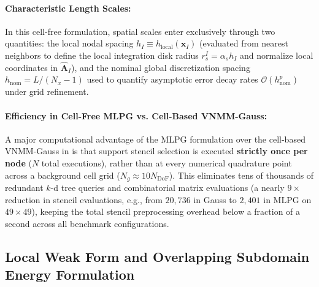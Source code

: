 \documentclass[VANCOUVER,Times1COL]{WileyNJD-v5}
\begin{document}
\paragraph{Characteristic Length Scales:}
In this cell-free formulation, spatial scales enter exclusively through two quantities:
the local nodal spacing $h_I \equiv h_{\mathrm{local}}(\mathbf{x}_I)$ (evaluated from nearest neighbors to define the local integration disk radius $r_s^I = \alpha_s h_I$ and normalize local coordinates in $\widehat{\mathbf{A}}_I$), and the nominal global discretization spacing $h_{\mathrm{nom}} = L/(N_x - 1)$ used to quantify asymptotic error decay rates $\mathcal{O}(h_{\mathrm{nom}}^p)$ under grid refinement.

\paragraph{Efficiency in Cell-Free MLPG vs. Cell-Based VNMM-Gauss:}
A major computational advantage of the MLPG formulation over the cell-based VNMM-Gauss in \cite{stable_vnmm2d_2026} is that support stencil selection is executed \textbf{strictly once per node} ($N$ total executions), rather than at every numerical quadrature point across a background cell grid ($N_g \approx 10 N_{\mathrm{DoF}}$). This eliminates tens of thousands of redundant $k$-d tree queries and combinatorial matrix evaluations (a nearly $9\times$ reduction in stencil evaluations, e.g., from $20{,}736$ in Gauss to $2{,}401$ in MLPG on $49\times 49$), keeping the total stencil preprocessing overhead below a fraction of a second across all benchmark configurations.

\subsection{Local Weak Form and Overlapping Subdomain Energy Formulation}
\label{subsec:local_weak_form}
\end{document}
